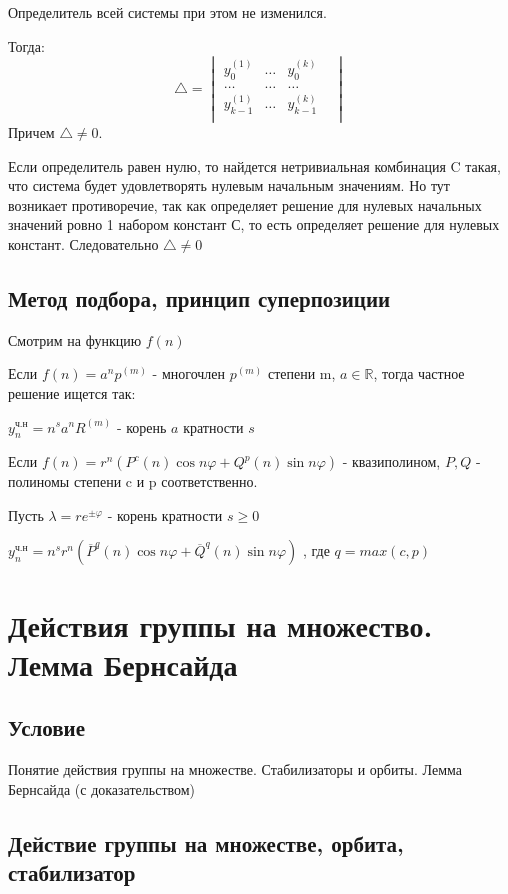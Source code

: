 \documentclass{report}
\begin{document}
Определитель всей системы при этом не изменился.

Тогда:
\[
	\triangle = \begin{vmatrix}
		y_{0}^{(1)}& \ldots& y_{0}^{(k)}&\\
		\ldots& \ldots& \ldots& \\
		y_{k-1}^{(1)}& \ldots& y_{k-1}^{(k)}&\\
	\end{vmatrix}
\] 
Причем $\triangle \neq 0$.

Если определитель равен нулю, то найдется нетривиальная комбинация C такая, что
система будет удовлетворять нулевым начальным значениям. Но тут возникает противоречие,
так как определяет решение для нулевых начальных значений ровно 1 набором констант С, то есть
определяет решение для нулевых констант. Следовательно $\triangle \neq 0$

\subsection{Метод подбора, принцип суперпозиции}
Смотрим на функцию $f(n)$

\medskip

Если $f(n) = a^{n}p^{(m)}$ - многочлен $p^{(m)}$ степени m, $a \in \mathbb{R}$, тогда
частное решение ищется так:

$y_{n}^{\mbox{ч.н}} = n^{s}a^{n}R^{(m)}$ - корень $a$ кратности  $s$

\medskip

Если  $f(n) = r^{n}(P^{c}(n)\cos n\varphi + Q^{p}(n)\sin n\varphi)$ - квазиполином, $P,Q$ -
полиномы степени c и p соответственно.

Пусть  $\lambda = re^{\pm \varphi}$ - корень кратности $s \ge 0$

$y_{n}^{\mbox{ч.н}} = n^{s}r^{n}(\overline{P}^{q}(n)\cos n\varphi + \overline{Q}^{q}(n)\sin n\varphi)$ 
, где $q = max(c,p)$

\newpage

\section{Действия группы на  множество. Лемма Бернсайда}
\subsection{Условие}
Понятие действия группы на множестве. Стабилизаторы и орбиты. Лемма Бернсайда (с
доказательством)

\subsection{Действие группы на множестве, орбита, стабилизатор}
\end{document}
